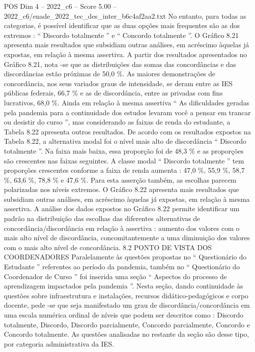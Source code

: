 \begin{textsample}{POS Dim 4 – 2022\_c6 – Score 5.00 – 2022\_c6/enade\_2022\_tec\_des\_inter\_b6c4af2aa2.txt}
No entanto, para todas as categorias, é possível identificar que as duas opções mais frequentes são as dos extremos : “ Discordo totalmente ” e “ Concordo totalmente ”.
O Gráfico 8.21 apresenta mais resultados que subsidiam outras análises, em acréscimo àquelas já expostas, em relação à mesma assertiva.
A partir dos resultados apresentados no Gráfico 8.21, nota -se que as distribuições das somas das concordâncias e das discordâncias estão próximas de 50,0 \%.
As maiores demonstrações de concordância, nos seus variados graus de intensidade, se deram entre as IES públicas federais, 66,7 \% e as de discordância, entre as privadas com fins lucrativos, 68,0 \%.
Ainda em relação à mesma assertiva “ As dificuldades geradas pela pandemia para a continuidade dos estudos levaram você a pensar em trancar ou desistir do curso ”, mas considerando as faixas de renda do estudante, a Tabela 8.22 apresenta outros resultados.
De acordo com os resultados expostos na Tabela 8.22, a alternativa modal foi o nível mais alto de discordância “ Discordo totalmente ”.
Na faixa mais baixa, essa proporção foi de 48,3 \% e as proporções são crescentes nas faixas seguintes.
A classe modal “ Discordo totalmente ” tem proporções crescentes conforme a faixa de renda aumenta : 47,0 \%, 55,9 \%, 58,7 \%, 63,6 \%, 78,8 \% e 47,6 \%.
Para esta asserção também, as escolhas parecem polarizadas nos níveis extremos.
O Gráfico 8.22 apresenta mais resultados que subsidiam outras análises, em acréscimo àquelas já expostas, em relação à mesma assertiva.
A análise dos dados expostos no Gráfico 8.22 permite identificar um padrão na distribuição das escolhas das diferentes alternativas de concordância/discordância em relação à assertiva : aumento dos valores com o mais alto nível de discordância, concomitantemente a uma diminuição dos valores com o mais alto nível de concordância. 8.2 PONTO DE VISTA DOS COORDENADORES Paralelamente às questões propostas no “ Questionário do Estudante ” referentes ao período da pandemia, também no “ Questionário do Coordenador de Curso ” foi inserida uma seção “ Aspectos do processo de aprendizagem impactados pela pandemia ”.
Nesta seção, dando continuidade às questões sobre infraestrutura e instalações, recursos didático-pedagógicos e corpo docente, pede -se que seja manifestado um grau de discordância/concordância em uma escala numérica ordinal de níveis que podem ser descritos como : Discordo totalmente, Discordo, Discordo parcialmente, Concordo parcialmente, Concordo e Concordo totalmente.
As questões analisadas no restante da seção são desse tipo, por categoria administrativa da IES.

\end{textsample}
